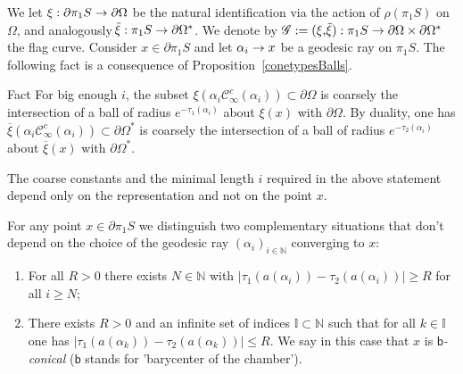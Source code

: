 \documentclass[AHL,Unicode,longabstracts,MathTools]{cedram}
\newcommand{\cartan}{a}
\renewcommand{\varXi}{\mathscr{G}}
\renewcommand{\sf}[1]{{\mathsf{#1}}}
\renewcommand{\flat}{\sf{b}}
\newcommand{\cal}{\mathcal}
\newcommand{\cone}{\cal{C}}
\newcommand{\N}{\mathbb{N}}
\newcommand{\I}{\mathbb{I}}
\newcommand{\bord}{\partial}
\newcommand{\piS}{\pi_1S}
\newcommand{\slroot}{{\tau}}
\newcommand{\ovxi}{\overline{\!\xi}}
\renewcommand{\/}{\backslash}
\newcommand{\<}{\langle}
\renewcommand{\>}{\rangle}
\renewcommand*{\to}{\mathchoice{\longrightarrow}{\rightarrow}{\rightarrow}{\rightarrow}}
\newcommand*{\relabel}{\renewcommand{\labelenumi}{(\theenumi)}}
\newcommand*{\romanenumi}{\renewcommand*{\theenumi}{\roman{enumi}}\relabel}
\begin{document}
We let $\xi:\bord\piS\to\bord\Omega$ be the natural identification via the action of $\rho(\piS)$ on~$\Omega$, and analogously $\ovxi:\piS\to\bord\Omega^*$. We denote by $\varXi:=(\xi,\ovxi): \piS\to\bord\Omega\times\bord\Omega^*$ the flag curve. Consider $x\in\bord\piS$ and let $\alpha_i\to x$ be a geodesic ray on $\piS$. The following fact is a consequence of Proposition~\ref{conetypesBalls}.

\begin{enonce}
{Fact} For big enough $i$, the subset $\xi(\alpha_i\cone^{c}_\infty(\alpha_i))\subset\bord\Omega$ is coarsely the intersection of a ball of radius $e^{-\slroot_1(\alpha_i)}$ about $\xi(x)$ with $\bord\Omega$. By duality, one has $\ovxi(\alpha_i\cone^{c}_\infty(\alpha_i))\subset\bord\Omega^*$ is coarsely the intersection of a ball of radius $e^{-\slroot_2(\alpha_i)}$ about $\ovxi(x)$ with $\bord\Omega^*$.
\end{enonce}

The coarse constants and the minimal length $i$ required in the above statement depend only on the representation and not on the point $x$.



For any point $x\in\bord\piS$ we distinguish two complementary situations that don't depend on the choice of the geodesic ray $(\alpha_i)_{i\in\N}$ converging to $x$:
\begin{enumerate}\romanenumi
\item For all $R>0$ there exists $N\in\N$ with $|\slroot_1(\cartan(\alpha_i))-\slroot_2(\cartan(\alpha_i))|\geq R$ for all $i\geq N;$
\item There exists $R>0$ and an infinite set of indices $\I\subset\N$ such that for all $k\in\I$ one has $|\slroot_1(\cartan(\alpha_k))-\slroot_2(\cartan(\alpha_k))|\leq R$. We say in this case that $x$ is $\flat$\emph{-conical} ($\flat$ stands for 'barycenter of the chamber').
\end{enumerate}
\end{document}

